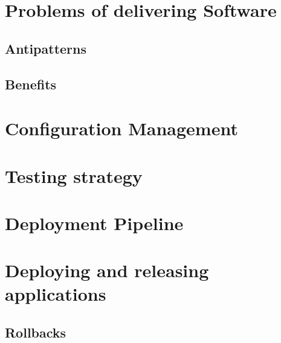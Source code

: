 \documentclass[conference]{IEEEtran}
\begin{document}
\section{Problems of delivering Software}

\subsection{Antipatterns}

\subsection{Benefits}

\section{Configuration Management}

\section{Testing strategy}

\section{Deployment Pipeline}

\section{Deploying and releasing applications}

\subsection{Rollbacks}


 
\end{document}
